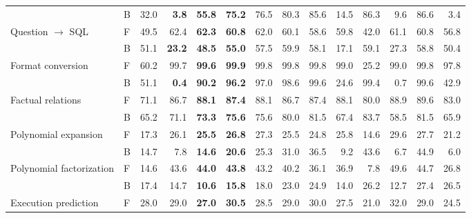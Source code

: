 \begin{table}[t]
\begin{tabular}{llrrrrrrrrrrrr}
 & B & 32.0 & \textcolor{red!70!black}{\textbf{3.8}} & \textcolor{blue!60!black}{\textbf{55.8}} & \textcolor{blue!60!black}{\textbf{75.2}} & 76.5 & 80.3 & 85.6 & 14.5 & 86.3 & 9.6 & 86.6 & 3.4 \\
\addlinespace[2pt]
Question $\to$ SQL & F & 49.5 & 62.4 & \textcolor{blue!60!black}{\textbf{62.3}} & \textcolor{blue!60!black}{\textbf{60.8}} & 62.0 & 60.1 & 58.6 & 59.8 & 42.0 & 61.1 & 60.8 & 56.8 \\
 & B & 51.1 & \textcolor{red!70!black}{\textbf{23.2}} & \textcolor{blue!60!black}{\textbf{48.5}} & \textcolor{blue!60!black}{\textbf{55.0}} & 57.5 & 59.9 & 58.1 & 17.1 & 59.1 & 27.3 & 58.8 & 50.4 \\
\addlinespace[2pt]
Format conversion & F & 60.2 & 99.7 & \textcolor{blue!60!black}{\textbf{99.6}} & \textcolor{blue!60!black}{\textbf{99.9}} & 99.8 & 99.8 & 99.8 & 99.0 & 25.2 & 99.0 & 99.8 & 97.8 \\
 & B & 51.1 & \textcolor{red!70!black}{\textbf{0.4}} & \textcolor{blue!60!black}{\textbf{90.2}} & \textcolor{blue!60!black}{\textbf{96.2}} & 97.0 & 98.6 & 99.6 & 24.6 & 99.4 & 0.7 & 99.6 & 42.9 \\
\addlinespace[2pt]
Factual relations & F & 71.1 & 86.7 & \textcolor{blue!60!black}{\textbf{88.1}} & \textcolor{blue!60!black}{\textbf{87.4}} & 88.1 & 86.7 & 87.4 & 88.1 & 80.0 & 88.9 & 89.6 & 83.0 \\
 & B & 65.2 & 71.1 & \textcolor{blue!60!black}{\textbf{73.3}} & \textcolor{blue!60!black}{\textbf{75.6}} & 75.6 & 80.0 & 81.5 & 67.4 & 83.7 & 58.5 & 81.5 & 65.9 \\
\addlinespace[2pt]
Polynomial expansion & F & 17.3 & 26.1 & \textcolor{blue!60!black}{\textbf{25.5}} & \textcolor{blue!60!black}{\textbf{26.8}} & 27.3 & 25.5 & 24.8 & 25.8 & 14.6 & 29.6 & 27.7 & 21.2 \\
 & B & 14.7 & 7.8 & \textcolor{blue!60!black}{\textbf{14.6}} & \textcolor{blue!60!black}{\textbf{20.6}} & 25.3 & 31.0 & 36.5 & 9.2 & 43.6 & 6.7 & 44.9 & 6.0 \\
\addlinespace[2pt]
Polynomial factorization & F & 14.6 & 43.6 & \textcolor{blue!60!black}{\textbf{44.0}} & \textcolor{blue!60!black}{\textbf{43.8}} & 43.2 & 40.2 & 36.1 & 36.9 & 7.8 & 49.6 & 44.7 & 26.8 \\
 & B & 17.4 & 14.7 & \textcolor{blue!60!black}{\textbf{10.6}} & \textcolor{blue!60!black}{\textbf{15.8}} & 18.0 & 23.0 & 24.9 & 14.0 & 26.2 & 12.7 & 27.4 & 26.5 \\
\addlinespace[2pt]
Execution prediction & F & 28.0 & 29.0 & \textcolor{blue!60!black}{\textbf{27.0}} & \textcolor{blue!60!black}{\textbf{30.5}} & 28.5 & 29.0 & 30.0 & 27.5 & 21.0 & 32.0 & 29.0 & 24.5 \\

\end{tabular}
\end{table}
